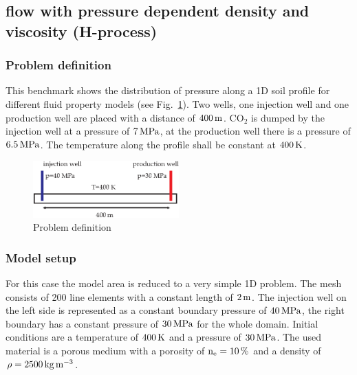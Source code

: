 
\subsection[{\ce{CO2}} flow with pressure dependent density and viscosity]{{} flow with pressure dependent density and viscosity (H-process)}

 
\subsubsection*{Problem definition}

This benchmark shows the distribution of pressure along a 1D soil profile for different fluid property models (see Fig.~\ref{fig-eos-probdef}). Two wells, one injection well and one production well are placed with a distance of $\unit[400]{m}$. $\mathrm{CO_2}$ is dumped by the injection well at a pressure of $\unit[7]{MPa}$, at the production well there is a pressure of $\unit[6.5]{MPa}$. The temperature along the profile shall be constant at $\unit[400]{K}$.  
 
 
\begin{figure}[h]
\centering
\includegraphics[width=0.5\textwidth]{FLUID_PROPERTIES/figures/Prob-def.eps}
\caption{Problem definition}
\label{fig-eos-probdef}
\end{figure}

\subsubsection*{Model setup}
For this case the model area is reduced to a very simple 1D problem. The mesh consists of 200 line elements with a constant length of $\unit[2]{m}$. The injection well on the left side is represented as a constant boundary pressure of $\unit[40]{MPa}$, the right boundary has a constant pressure of $\unit[30]{MPa}$ for the whole domain. Initial conditions are a temperature of $\unit[400]{K}$ and a pressure of $\unit[30]{MPa}$. The used material is a porous medium with a porosity of $\mathrm{n_e}=\unit[10]{\%}$ and a density of $\mathrm{\rho}=\unit[2500]{kg\,m^{-3}}$. 

